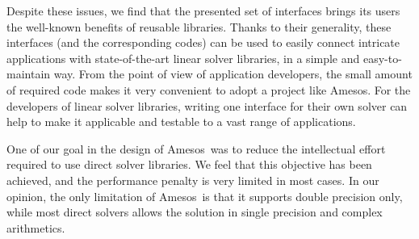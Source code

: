 \documentclass{llncs}
\newcommand{\amesos}{{\sc Amesos}}
\begin{document}
Despite these issues, we find that the presented set of interfaces
brings its users the well-known benefits of reusable libraries.
Thanks to their generality, these interfaces (and the corresponding
codes) can be used to easily connect intricate applications with
state-of-the-art linear solver libraries, in a simple and
easy-to-maintain way. From the point of view of application
developers, the small amount of required code makes it very
convenient to adopt a project like \amesos. For the developers of linear solver
libraries,  writing one interface for their own solver
can help to make it applicable and testable to a vast range of
applications.

One of our goal in the design of \amesos\ was to reduce the intellectual
effort required to use direct solver libraries. We feel that this objective
has been achieved, and the performance penalty is very limited in most cases.
In our opinion, the only limitation of \amesos\ is that it supports double
precision only, while most direct solvers allows the solution in single
precision and complex arithmetics.



\end{document}
